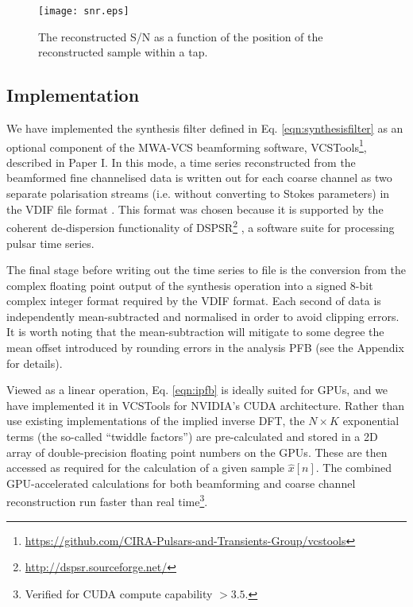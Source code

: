 \documentclass{pasa}%
\newcommand{\PaperI}{Paper I\nocite{Ord2019}}
\newcommand{\vcstools}{VCSTools}
\begin{document}

\begin{figure}
    \centering
    \texttt{[image: snr.eps]}
    \caption{The reconstructed S/N as a function of the position of the reconstructed sample within a tap.}
    \label{fig:snr}
\end{figure}

\subsection{Implementation}

We have implemented the synthesis filter defined in Eq. \eqref{eqn:synthesisfilter} as an optional component of the MWA-VCS beamforming software, \vcstools{}\footnote{\url{https://github.com/CIRA-Pulsars-and-Transients-Group/vcstools}}, described in \PaperI{}.
In this mode, a time series reconstructed from the beamformed fine channelised data is written out for each coarse channel as two separate polarisation streams (i.e. without converting to Stokes parameters) in the VDIF file format \citep{Whitney2009}.
This format was chosen because it is supported by the coherent de-dispersion functionality of DSPSR\footnote{\url{http://dspsr.sourceforge.net/}} \citep{VanStraten2011b}, a software suite for processing pulsar time series.

The final stage before writing out the time series to file is the conversion from the complex floating point output of the synthesis operation into a signed 8-bit complex integer format required by the VDIF format.
Each second of data is independently mean-subtracted and normalised in order to avoid clipping errors.
It is worth noting that the mean-subtraction will mitigate to some degree the mean offset introduced by rounding errors in the analysis PFB (see the Appendix for details).

Viewed as a linear operation, Eq. \eqref{eqn:ipfb} is ideally suited for GPUs, and we have implemented it in \vcstools{} for NVIDIA's CUDA architecture.
Rather than use existing implementations of the implied inverse DFT, the $N \times K$ exponential terms (the so-called ``twiddle factors'') are pre-calculated and stored in a 2D array of double-precision floating point numbers on the GPUs.
These are then accessed as required for the calculation of a given sample $\hat{x}[n]$.
The combined GPU-accelerated calculations for both beamforming and coarse channel reconstruction run faster than real time\footnote{Verified for CUDA compute capability $>3.5$.}.
\end{document}
